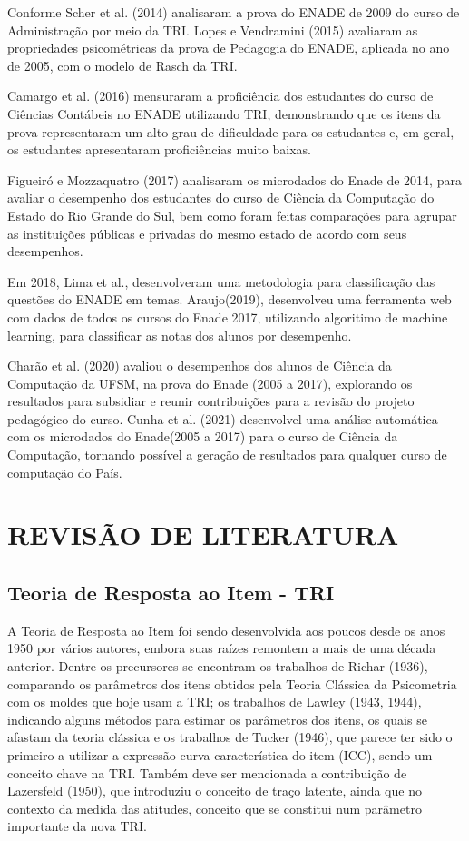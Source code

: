 \documentclass[12pt]{article}
\begin{document}
\newpage
Conforme Scher et al. (2014) analisaram a prova do ENADE de 2009 do curso de Administração por meio da TRI. Lopes e Vendramini (2015) avaliaram as propriedades psicométricas da prova de Pedagogia do ENADE, aplicada no ano de 2005, com o modelo de Rasch da TRI.

Camargo et al. (2016) mensuraram a proficiência dos estudantes do curso de Ciências Contábeis no ENADE utilizando TRI, demonstrando que os itens da prova representaram um alto grau de dificuldade para os estudantes e, em geral, os estudantes apresentaram proficiências muito baixas.

Figueiró e Mozzaquatro (2017) analisaram os microdados do Enade de 2014, para avaliar o desempenho dos estudantes do curso de Ciência da
Computação do Estado do Rio Grande do Sul, bem como foram feitas comparações para
agrupar as instituições públicas e privadas do mesmo estado de acordo com seus
desempenhos.


Em 2018, Lima et al., desenvolveram uma metodologia para classificação das questões do ENADE em temas. Araujo(2019), desenvolveu uma ferramenta web com dados de todos os cursos do Enade 2017, utilizando algoritimo de machine learning, para classificar as notas dos alunos por desempenho.

Charão et al. (2020) avaliou o desempenhos dos alunos de Ciência da Computação da UFSM, na prova do Enade (2005 a 2017), explorando os resultados para subsidiar e reunir contribuições para a revisão do projeto pedagógico do curso. Cunha et al. (2021) desenvolvel uma análise automática com os microdados do Enade(2005 a 2017) para o curso de Ciência da Computação, tornando possível a geração de resultados para qualquer curso de computação do País.
\vskip0.3cm

\section{REVISÃO DE LITERATURA} \label{sec:firstpage}
\subsection{Teoria de Resposta ao Item - TRI}

A Teoria de Resposta ao Item foi sendo desenvolvida aos poucos desde os anos 1950 por vários autores, embora suas raízes remontem a mais de uma década anterior. Dentre os precursores se encontram os trabalhos de Richar (1936), comparando os parâmetros dos itens obtidos pela Teoria Clássica da Psicometria com os moldes que hoje usam a TRI; os trabalhos de Lawley (1943, 1944), indicando alguns métodos para estimar os parâmetros dos itens, os quais se afastam da teoria clássica e os trabalhos de Tucker (1946), que parece ter sido o primeiro a utilizar a expressão curva característica do item (ICC), sendo um conceito chave na TRI. Também deve ser mencionada a contribuição de Lazersfeld (1950), que introduziu o conceito de traço latente, ainda que no contexto da medida das atitudes, conceito que se constitui num parâmetro importante da nova TRI.
\end{document}
